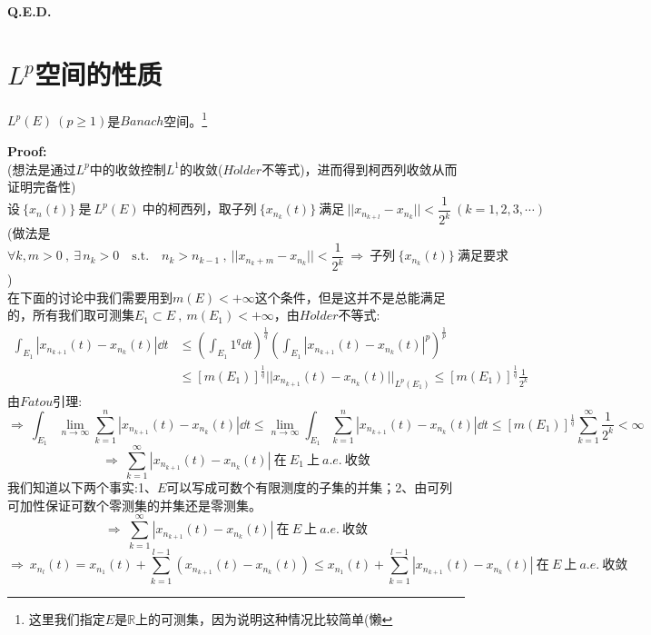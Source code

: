 \textbf{Q.E.D.}

\section{$L^p$空间的性质}
\begin{theorem}
    $L^p(E) \ (p \geq 1)$是$Banach$空间。\footnote{这里我们指定$E$是$\mathbb{R}$上的可测集，因为说明这种情况比较简单(懒}
\end{theorem}
\textbf{Proof:} \\
(想法是通过$L^p$中的收敛控制$L^1$的收敛($H\ddot{o}lder$不等式)，进而得到柯西列收敛从而证明完备性)
\[\text{设} \ \{x_n(t)\} \ \text{是} \ L^p(E) \ \text{中的柯西列，取子列} \ \{x_{n_k}(t)\} \ \text{满足} \ ||x_{n_{k+l}}-x_{n_k}||<\frac{1}{2^k} \ (k=1,2,3,\cdots)\]
(做法是
\[\forall k,m>0 \ , \ \exists \, n_k>0 \quad \text{s.t.} \quad n_{k}>n_{k-1} \ , \ ||x_{n_k+m}-x_{n_k}||<\frac{1}{2^k} \ \Rightarrow \ \text{子列} \ \{x_{n_k}(t)\} \ \text{满足要求}\]
)\\
在下面的讨论中我们需要用到$m(E)<+\infty$这个条件，但是这并不是总能满足的，所有我们取可测集$E_1 \subset E \ , \ m(E_1)<+\infty$，由$H\ddot{o}lder$不等式:
\begin{equation*}
    \begin{aligned}
        \int_{E_1}|x_{n_{k+1}}(t)-x_{n_k}(t)|\dd t & \leq \left(\int_{E_1}1^q\dd t\right)^{\frac{1}{q}}\left(\int_{E_1}|x_{n_{k+1}}(t)-x_{n_k}(t)|^p\right)^{\frac{1}{p}} \\
        & \leq \left[m(E_1)\right]^{\frac{1}{q}}||x_{n_{k+1}}(t)-x_{n_k}(t)||_{L^p(E_1)} \leq \left[m(E_1)\right]^{\frac{1}{q}}\frac{1}{2^k}
    \end{aligned}
\end{equation*}
由$Fatou$引理:
\[\Rightarrow \ \int_{E_1} \lim_{n \to \infty}\sum_{k=1}^n|x_{n_{k+1}}(t)-x_{n_k}(t)|\dd t \leq \lim_{n \to \infty} \int_{E_1} \sum_{k=1}^n|x_{n_{k+1}}(t)-x_{n_k}(t)|\dd t \leq \left[m(E_1)\right]^{\frac{1}{q}}\sum_{k=1}^{\infty}\frac{1}{2^k}<\infty\]
\[\Rightarrow \ \sum_{k=1}^{\infty}|x_{n_{k+1}}(t)-x_{n_k}(t)| \ \text{在} \ E_1 \ \text{上} \ a.e. \ \text{收敛}\]
我们知道以下两个事实:1、$E$可以写成可数个有限测度的子集的并集；2、由可列可加性保证可数个零测集的并集还是零测集。
\[\Rightarrow \ \sum_{k=1}^{\infty}|x_{n_{k+1}}(t)-x_{n_k}(t)| \ \text{在} \ E \ \text{上} \ a.e. \ \text{收敛}\]
\[\Rightarrow \ x_{n_l}(t)=x_{n_1}(t)+\sum_{k=1}^{l-1}\left(x_{n_{k+1}}(t)-x_{n_k}(t)\right) \leq x_{n_1}(t)+\sum_{k=1}^{l-1}|x_{n_{k+1}}(t)-x_{n_k}(t)| \ \text{在} \ E \ \text{上} \ a.e. \ \text{收敛}\]

